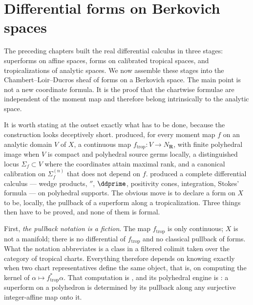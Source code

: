 \chapter{Differential forms on Berkovich spaces}
\label{chap:cld-forms}

The preceding chapters built the real differential calculus in three stages:
superforms on affine spaces, forms on calibrated tropical spaces, and
tropicalizations of analytic spaces.  We now assemble these stages into the
Chambert--Loir--Ducros sheaf of forms on a Berkovich space.  The main point is
not a new coordinate formula.  It is the proof that the chartwise formulae are
independent of the moment map and therefore belong intrinsically to the
analytic space.

It is worth stating at the outset exactly what has to be done, because the
construction looks deceptively short.  
produced, for every moment map $f$ on an analytic domain $V$ of $X$, a
continuous map $f_{\mathrm{trop}}:V\to N_{\mathbf R}$, with finite
polyhedral image when $V$ is compact and polyhedral source germs locally,
a distinguished locus $\Sigma_f\subset V$ where the coordinates attain
maximal rank, and a canonical calibration on $\Sigma_f^{(n)}$ that does not
depend on $f$.  
produced a complete differential calculus --- wedge products, $\dprime$,
$\ddprime$, positivity cones, integration, Stokes' formula --- on polyhedral
supports.  The obvious move is to declare a form on $X$ to be, locally, the
pullback of a superform along a tropicalization.  Three things then have to
be proved, and none of them is formal.

First, \emph{the pullback notation is a fiction}.  The map
$f_{\mathrm{trop}}$ is only continuous; $X$ is not a manifold; there is no
differential of $f_{\mathrm{trop}}$ and no classical pullback of forms.  What
the notation abbreviates is a class in a filtered colimit taken over the
category of tropical charts.  Everything therefore depends on knowing exactly
when two chart representatives define the same object, that is, on computing
the kernel of $\alpha\mapsto f_{\mathrm{trop}}^*\alpha$.  That computation is
, and its polyhedral engine is
: a superform on a polyhedron
is determined by its pullback along any surjective integer-affine map onto
it.

